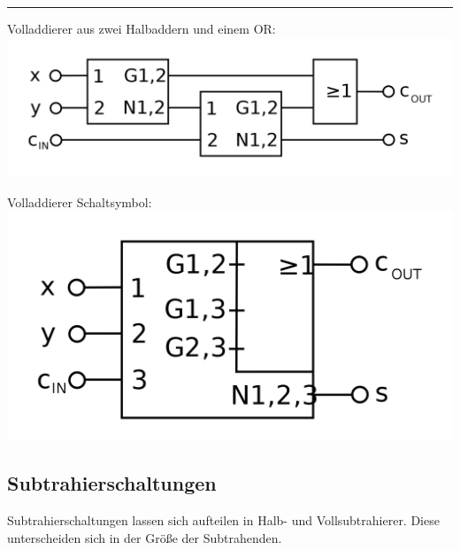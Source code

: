 \documentclass[12pt,a4paper]{article}
\begin{document}
\par\noindent\rule{\textwidth}{0.4pt}
\vspace{.5cm}
\begin{minipage}[t]{.45\textwidth}
	\begin{center}
		Volladdierer aus zwei Halbaddern und einem OR:
		\includegraphics[scale=.13]{Bilder/VolladiererAlternativ.png}
	\end{center}
\end{minipage}
\hspace{1cm}
\begin{minipage}[t]{.45\textwidth}
	\begin{center}
		Volladdierer Schaltsymbol:
		\includegraphics[scale=.13]{Bilder/VolladdiererSymbol.png}
	\end{center}
\end{minipage}

\subsection{Subtrahierschaltungen}
    Subtrahierschaltungen lassen sich aufteilen in Halb- und Vollsubtrahierer. Diese unterscheiden sich in der Größe der Subtrahenden.
\end{document}
